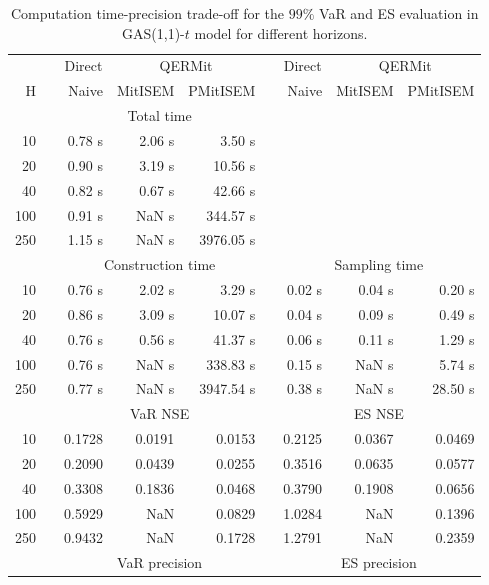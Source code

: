 { \renewcommand{\arraystretch}{1.3} 
\begin{table}[h] 
\centering 
\caption{Computation time-precision trade-off for the  $99\%$ VaR and ES evaluation in GAS(1,1)-$t$ model for different horizons.} 
\label{tab:time_precision_t_gas_ML} 
\begin{tabular}{rr rrr r rrr}  
 & & \multicolumn{1}{c}{Direct} & \multicolumn{2}{c}{QERMit}&  & \multicolumn{1}{c}{Direct} & \multicolumn{2}{c}{QERMit} \\ \cline{3-5} \cline{7-9} 
 H & & Naive & MitISEM & PMitISEM & & Naive & MitISEM & PMitISEM \\ \hline 
 & & \multicolumn{3}{c}{Total time}  \\ \cline{3-5} 
10 & & 0.78 s & 2.06 s & 3.50 s  \\ 
20 & & 0.90 s & 3.19 s & 10.56 s  \\ 
40 & & 0.82 s & 0.67 s & 42.66 s  \\ 
100 & & 0.91 s &  NaN s & 344.57 s  \\ 
250 & & 1.15 s &  NaN s & 3976.05 s  \\ 
\hline 
 & & \multicolumn{3}{c}{Construction time} & & \multicolumn{3}{c}{ Sampling time} \\ \cline{3-5}  \cline{7-9}
10 & & 0.76 s & 2.02 s & 3.29 s &&  0.02 s & 0.04 s & 0.20 s \\ 
20 & & 0.86 s & 3.09 s & 10.07 s &&  0.04 s & 0.09 s & 0.49 s \\ 
40 & & 0.76 s & 0.56 s & 41.37 s &&  0.06 s & 0.11 s & 1.29 s \\ 
100 & & 0.76 s &  NaN s & 338.83 s &&  0.15 s &  NaN s & 5.74 s \\ 
250 & & 0.77 s &  NaN s & 3947.54 s &&  0.38 s &  NaN s & 28.50 s \\ 
\hline 
 & & \multicolumn{3}{c}{VaR NSE} &&  \multicolumn{3}{c}{ES NSE} \\ \cline{3-5}  \cline{7-9}
10 && 0.1728  & 0.0191  & 0.0153 && 0.2125  & 0.0367  & 0.0469  \\ 
20 && 0.2090  & 0.0439  & 0.0255 && 0.3516  & 0.0635  & 0.0577  \\ 
40 && 0.3308  & 0.1836  & 0.0468 && 0.3790  & 0.1908  & 0.0656  \\ 
100 && 0.5929  &    NaN  & 0.0829 && 1.0284  &    NaN  & 0.1396  \\ 
250 && 0.9432  &    NaN  & 0.1728 && 1.2791  &    NaN  & 0.2359  \\ 
\hline 
 & & \multicolumn{3}{c}{VaR precision} &&  \multicolumn{3}{c}{ES precision} \\ \cline{3-5}  \cline{7-9}

\end{tabular}
\end{table}}
